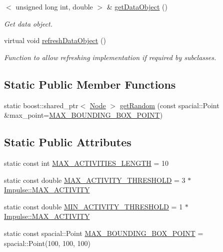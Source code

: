 \begin{DoxyCompactItemize}
$<$ unsigned long int, double $>$ \& \hyperlink{classcryomesh_1_1dataobjects_1_1DataObjectController_aa919e8676a611028c6b6e6791c87f438}{get\-Data\-Object} ()
\begin{DoxyCompactList}\small\item\em \-Get data object. \end{DoxyCompactList}\item 
virtual void \hyperlink{classcryomesh_1_1dataobjects_1_1DataObjectController_ae015efe3d10cced82d5043f560cbe04f}{refresh\-Data\-Object} ()
\begin{DoxyCompactList}\small\item\em \-Function to allow refreshing implementation if required by subclasses. \end{DoxyCompactList}\end{DoxyCompactItemize}
\subsection*{\-Static \-Public \-Member \-Functions}
\begin{DoxyCompactItemize}
\item 
static boost\-::shared\-\_\-ptr$<$ \hyperlink{classcryomesh_1_1components_1_1Node}{\-Node} $>$ \hyperlink{classcryomesh_1_1components_1_1Node_a3ffbf4f53801b9e83c815e97e3072302}{get\-Random} (const spacial\-::\-Point \&max\-\_\-point=\hyperlink{classcryomesh_1_1components_1_1Node_a3f4f3b7d2bba533fc0487b4f10c1efcd}{\-M\-A\-X\-\_\-\-B\-O\-U\-N\-D\-I\-N\-G\-\_\-\-B\-O\-X\-\_\-\-P\-O\-I\-N\-T})
\end{DoxyCompactItemize}
\subsection*{\-Static \-Public \-Attributes}
\begin{DoxyCompactItemize}
\item 
static const int \hyperlink{classcryomesh_1_1components_1_1Node_ae5b4fa1289a3ab819710ff7a40a77282}{\-M\-A\-X\-\_\-\-A\-C\-T\-I\-V\-I\-T\-I\-E\-S\-\_\-\-L\-E\-N\-G\-T\-H} = 10
\item 
static const double \hyperlink{classcryomesh_1_1components_1_1Node_adcfc8e07f6d216817a45f1c27190967b}{\-M\-A\-X\-\_\-\-A\-C\-T\-I\-V\-I\-T\-Y\-\_\-\-T\-H\-R\-E\-S\-H\-O\-L\-D} = 3 $\ast$ \hyperlink{classcryomesh_1_1components_1_1Impulse_af8e9eb795f1ea3cef81d6afeb7166ad2}{\-Impulse\-::\-M\-A\-X\-\_\-\-A\-C\-T\-I\-V\-I\-T\-Y}
\item 
static const double \hyperlink{classcryomesh_1_1components_1_1Node_a5ed72f665cf7b32914e61b4655bd52ca}{\-M\-I\-N\-\_\-\-A\-C\-T\-I\-V\-I\-T\-Y\-\_\-\-T\-H\-R\-E\-S\-H\-O\-L\-D} = 1 $\ast$ \hyperlink{classcryomesh_1_1components_1_1Impulse_af8e9eb795f1ea3cef81d6afeb7166ad2}{\-Impulse\-::\-M\-A\-X\-\_\-\-A\-C\-T\-I\-V\-I\-T\-Y}
\item 
static const spacial\-::\-Point \hyperlink{classcryomesh_1_1components_1_1Node_a3f4f3b7d2bba533fc0487b4f10c1efcd}{\-M\-A\-X\-\_\-\-B\-O\-U\-N\-D\-I\-N\-G\-\_\-\-B\-O\-X\-\_\-\-P\-O\-I\-N\-T} = spacial\-::\-Point(100, 100, 100)
\end{DoxyCompactItemize}
